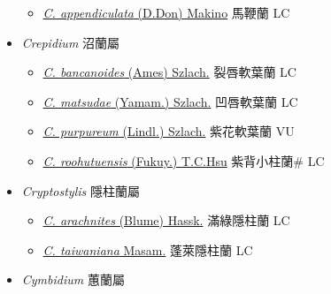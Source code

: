\begin{itemize}
  \begin{itemize}
        \item[] \href{http://www.theplantlist.org/tpl1.1/search?q=Cremastra+appendiculata}{\textit{C. appendiculata} (D.Don) Makino}   馬鞭蘭 LC
  \end{itemize}
 \item[] \textit{Crepidium} 沼蘭屬
                    
  \begin{itemize}
        \item[] \href{http://www.theplantlist.org/tpl1.1/search?q=Crepidium+bancanoides}{\textit{C. bancanoides} (Ames) Szlach.}     裂唇軟葉蘭 LC
        \item[] \href{http://www.theplantlist.org/tpl1.1/search?q=Crepidium+matsudae}{\textit{C. matsudae} (Yamam.) Szlach.}     凹唇軟葉蘭 LC
        \item[] \href{http://www.theplantlist.org/tpl1.1/search?q=Crepidium+purpureum}{\textit{C. purpureum} (Lindl.) Szlach.}     紫花軟葉蘭 VU
        \item[] \href{http://www.theplantlist.org/tpl1.1/search?q=Crepidium+roohutuensis}{\textit{C. roohutuensis} (Fukuy.) T.C.Hsu}   紫背小柱蘭\# LC
  \end{itemize}
 \item[] \textit{Cryptostylis} 隱柱蘭屬
                    
  \begin{itemize}
        \item[] \href{http://www.theplantlist.org/tpl1.1/search?q=Cryptostylis+arachnites}{\textit{C. arachnites} (Blume) Hassk.}   滿綠隱柱蘭 LC
        \item[] \href{http://www.theplantlist.org/tpl1.1/search?q=Cryptostylis+taiwaniana}{\textit{C. taiwaniana} Masam.}   蓬萊隱柱蘭 LC
  \end{itemize}
 \item[] \textit{Cymbidium} 蕙蘭屬
                    

\end{itemize}
